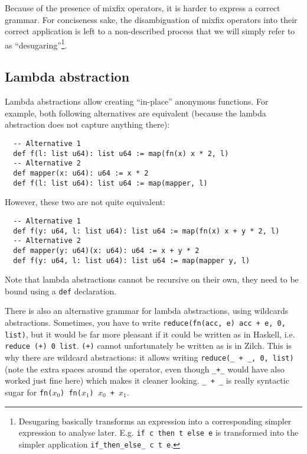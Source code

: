 Because of the presence of mixfix operators, it is harder to express a correct grammar.
For conciseness sake, the disambiguation of mixfix operators into their correct application is left to a non-described process that we will simply refer to as ``desugaring''\footnote{Desugaring basically transforms an expression into a corresponding simpler expression to analyse later. E.g. \texttt{if c then t else e} is transformed into the simpler application \texttt{if\_then\_else\_ c t e}.}.

\subsection{Lambda abstraction}\label{subsec:zilch-grammar-expressions-lambda}

Lambda abstractions allow creating ``in-place'' anonymous functions.
For example, both following alternatives are equivalent (because the lambda abstraction does not capture anything there):\\
\begin{verbatim}
  -- Alternative 1
  def f(l: list u64): list u64 := map(fn(x) x * 2, l)
  -- Alternative 2
  def mapper(x: u64): u64 := x * 2
  def f(l: list u64): list u64 := map(mapper, l)
\end{verbatim}
\vspace*{\baselineskip}

\noindent However, these two are not quite equivalent:\\
\begin{verbatim}
  -- Alternative 1
  def f(y: u64, l: list u64): list u64 := map(fn(x) x + y * 2, l)
  -- Alternative 2
  def mapper(y: u64)(x: u64): u64 := x + y * 2
  def f(y: u64, l: list u64): list u64 := map(mapper y, l)
\end{verbatim}
\vspace*{\baselineskip}

\noindent Note that lambda abstractions cannot be recursive on their own, they need to be bound using a \texttt{def} declaration.

There is also an alternative grammar for lambda abstractions, using wildcards abstractions.
Sometimes, you have to write \verb|reduce(fn(acc, e) acc + e, 0, list)|, but it would be far more pleasant if it could be written as in Haskell, i.e. \verb|reduce (+) 0 list|.
\verb|(+)| cannot unfortunately be written as is in Zilch.
This is why there are wildcard abstractions: it allows writing \verb|reduce(_ + _, 0, list)| (note the extra spaces around the operator, even though \verb|_+_| would have also worked just fine here) which makes it cleaner looking.
\verb|_ + _| is really syntactic sugar for \texttt{fn($x_0$) fn($x_1$) $x_0$ + $x_1$}.

